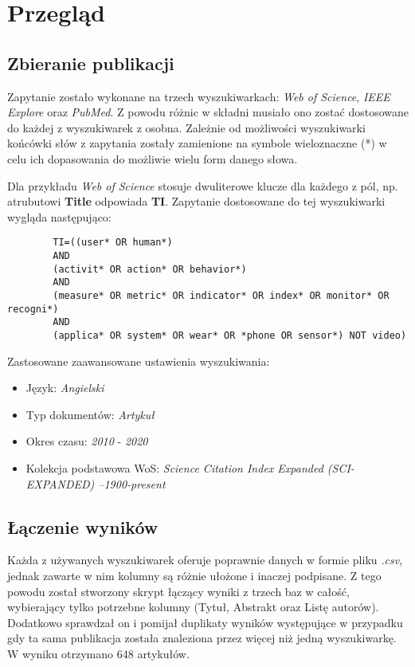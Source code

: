 \section{Przegląd}

\subsection{Zbieranie publikacji}
Zapytanie zostało wykonane na trzech wyszukiwarkach: \textit{Web of Science}, \textit{IEEE Explore} oraz \textit{PubMed}. Z powodu różnic w składni musiało ono zostać dostosowane do każdej z wyszukiwarek z osobna. Zależnie od możliwości wyszukiwarki końcówki słów z zapytania zostały zamienione na symbole wieloznaczne (*) w celu ich dopasowania do możliwie wielu form danego słowa.

Dla przykładu \textit{Web of Science} stosuje dwuliterowe klucze dla każdego z pól, np. atrubutowi {\bf Title} odpowiada {\bf TI}. Zapytanie dostosowane do tej wyszukiwarki wygląda następująco:
\begin{center}
	\begin{minipage}{0.85\linewidth}
		\begin{verbatim}
		TI=((user* OR human*) 
		AND 
		(activit* OR action* OR behavior*)
		AND 
		(measure* OR metric* OR indicator* OR index* OR monitor* OR recogni*) 
		AND 
		(applica* OR system* OR wear* OR *phone OR sensor*) NOT video)
		\end{verbatim}
	\end{minipage}
\end{center}
Zastosowane zaawansowane ustawienia wyszukiwania:
\begin{itemize}
    \item Język: {\it Angielski}
    \item Typ dokumentów: {\it Artykuł}
    \item Okres czasu: {\it 2010} - {\it 2020}
    \item Kolekcja podstawowa WoS: {\it Science Citation Index Expanded (SCI-EXPANDED) --1900-present}
\end{itemize}

\subsection{Łączenie wyników}
Każda z używanych wyszukiwarek oferuje poprawnie danych w formie pliku {\it .csv}, jednak zawarte w nim kolumny są różnie ułożone i inaczej podpisane. Z tego powodu został stworzony skrypt łączący wyniki z trzech baz w całość, wybierający tylko potrzebne kolumny (Tytuł, Abstrakt oraz Listę autorów). Dodatkowo sprawdzał on i pomijał duplikaty wyników występujące w przypadku gdy ta sama publikacja została znaleziona przez więcej niż jedną wyszukiwarkę. W wyniku otrzymano 648 artykułów.

